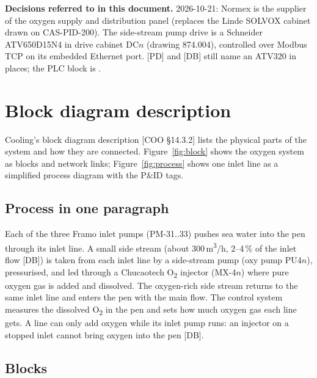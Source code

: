 \documentclass[11pt,a4paper]{article}
\newcommand{\Otwo}{O\textsubscript{2}}
\begin{document}
\textbf{Decisions referred to in this document.}
 2026-10-21: Normex is the supplier of the oxygen supply and distribution panel (replaces
the Linde SOLVOX cabinet drawn on CAS-PID-200).
 The side-stream pump drive is a Schneider ATV650D15N4 in drive cabinet DC$n$ (drawing
874.004), controlled over Modbus TCP on its embedded Ethernet port. [PD] and [DB] still name an
ATV320 in places; the PLC block is .

\section{Block diagram description}
\label{sec:block}

Cooling's block diagram description [COO \S14.3.2] lists the physical parts of the system and how
they are connected. Figure~\ref{fig:block} shows the oxygen system as blocks and network links;
Figure~\ref{fig:process} shows one inlet line as a simplified process diagram with the P\&ID tags.

\subsection{Process in one paragraph}
Each of the three Framo inlet pumps (PM-31..33) pushes sea water into the pen through its inlet line.
A small side stream (about 300\,m\textsuperscript{3}/h, 2--4\,\% of the inlet flow [DB]) is
taken from each inlet line by a side-stream pump (oxy pump PU4$n$), pressurised, and led through a
Chucaotech \Otwo{} injector (MX-4$n$) where pure oxygen gas is added and dissolved. The
oxygen-rich side stream returns to the same inlet line and enters the pen with the main flow.
The control system measures the dissolved \Otwo{} in the pen and sets how much oxygen gas each line
gets. A line can only add oxygen while its inlet pump runs: an injector on a stopped inlet cannot
bring oxygen into the pen [DB].

\subsection{Blocks}
\end{document}
